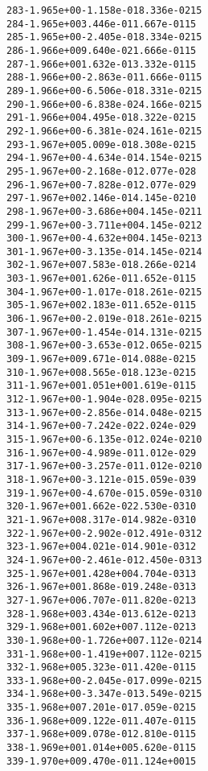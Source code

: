 \begin{alltt}
 283  -1.965e+00  -1.158e-01   8.336e-02   15
 284  -1.965e+00   3.446e-01   1.667e-01   15
 285  -1.965e+00  -2.405e-01   8.334e-02   15
 286  -1.966e+00   9.640e-02   1.666e-01   15
 287  -1.966e+00   1.632e-01   3.332e-01   15
 288  -1.966e+00  -2.863e-01   1.666e-01   15
 289  -1.966e+00  -6.506e-01   8.331e-02   15
 290  -1.966e+00  -6.838e-02   4.166e-02   15
 291  -1.966e+00   4.495e-01   8.322e-02   15
 292  -1.966e+00  -6.381e-02   4.161e-02   15
 293  -1.967e+00   5.009e-01   8.308e-02   15
 294  -1.967e+00  -4.634e-01   4.154e-02   15
 295  -1.967e+00  -2.168e-01   2.077e-02    8
 296  -1.967e+00  -7.828e-01   2.077e-02    9
 297  -1.967e+00   2.146e-01   4.145e-02   10
 298  -1.967e+00  -3.686e+00   4.145e-02   11
 299  -1.967e+00  -3.711e+00   4.145e-02   12
 300  -1.967e+00  -4.632e+00   4.145e-02   13
 301  -1.967e+00  -3.135e-01   4.145e-02   14
 302  -1.967e+00   7.583e-01   8.266e-02   14
 303  -1.967e+00   1.626e-01   1.652e-01   15
 304  -1.967e+00  -1.017e-01   8.261e-02   15
 305  -1.967e+00   2.183e-01   1.652e-01   15
 306  -1.967e+00  -2.019e-01   8.261e-02   15
 307  -1.967e+00  -1.454e-01   4.131e-02   15
 308  -1.967e+00  -3.653e-01   2.065e-02   15
 309  -1.967e+00   9.671e-01   4.088e-02   15
 310  -1.967e+00   8.565e-01   8.123e-02   15
 311  -1.967e+00   1.051e+00   1.619e-01   15
 312  -1.967e+00  -1.904e-02   8.095e-02   15
 313  -1.967e+00  -2.856e-01   4.048e-02   15
 314  -1.967e+00  -7.242e-02   2.024e-02    9
 315  -1.967e+00  -6.135e-01   2.024e-02   10
 316  -1.967e+00  -4.989e-01   1.012e-02    9
 317  -1.967e+00  -3.257e-01   1.012e-02   10
 318  -1.967e+00  -3.121e-01   5.059e-03    9
 319  -1.967e+00  -4.670e-01   5.059e-03   10
 320  -1.967e+00   1.662e-02   2.530e-03   10
 321  -1.967e+00   8.317e-01   4.982e-03   10
 322  -1.967e+00  -2.902e-01   2.491e-03   12
 323  -1.967e+00   4.021e-01   4.901e-03   12
 324  -1.967e+00  -2.461e-01   2.450e-03   13
 325  -1.967e+00   1.428e+00   4.704e-03   13
 326  -1.967e+00   1.868e-01   9.248e-03   13
 327  -1.967e+00   6.707e-01   1.820e-02   13
 328  -1.968e+00   3.434e-01   3.612e-02   13
 329  -1.968e+00   1.602e+00   7.112e-02   13
 330  -1.968e+00  -1.726e+00   7.112e-02   14
 331  -1.968e+00  -1.419e+00   7.112e-02   15
 332  -1.968e+00   5.323e-01   1.420e-01   15
 333  -1.968e+00  -2.045e-01   7.099e-02   15
 334  -1.968e+00  -3.347e-01   3.549e-02   15
 335  -1.968e+00   7.201e-01   7.059e-02   15
 336  -1.968e+00   9.122e-01   1.407e-01   15
 337  -1.968e+00   9.078e-01   2.810e-01   15
 338  -1.969e+00   1.014e+00   5.620e-01   15
 339  -1.970e+00   9.470e-01   1.124e+00   15

\end{alltt}

